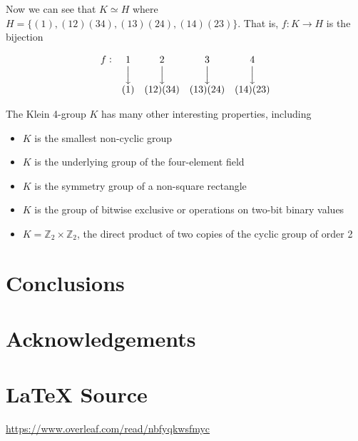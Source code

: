\documentclass{article}
\theoremstyle{definition}
\DeclareMathOperator{\bda}{\Big \downarrow}						%
\begin{document}
\bigskip
\noindent
Now we can see that $K \simeq H$ where $H = \{(1), (12)(34),
(13)(24), (14)(23)\}$. That is, $f:K\rightarrow H$ is the
bijection

\bigskip
\begin{equation*}
\begin{array}{c c c c c}
f: &  1   & 2        & 3        & 4 \\
   & \bda & \bda     & \bda     & \bda \\
   & (1)  & (12)(34) & (13)(24) &  (14)(23)
\end{array}
\end{equation*}

\bigskip
\noindent
The Klein 4-group $K$ has many other interesting properties,
including 

\begin{itemize}
\item $K$ is the smallest non-cyclic group
\item $K$ is the underlying group of the four-element field
\item $K$ is the symmetry group of a non-square rectangle 
\item $K$ is the group of bitwise exclusive or operations on two-bit binary values
\item $K = \mathbb{Z}_2 \times \mathbb{Z}_2$, the direct product
      of two copies of the cyclic group of order 2 
\end{itemize}
%
%
%
\section{Conclusions}
%
%
%
\section{Acknowledgements}
%
%
\section*{\LaTeX \hspace{0.10 mm} Source}
\url{https://www.overleaf.com/read/nbfyqkwsfmyc}
%
%
%


%
%
\end{document}
